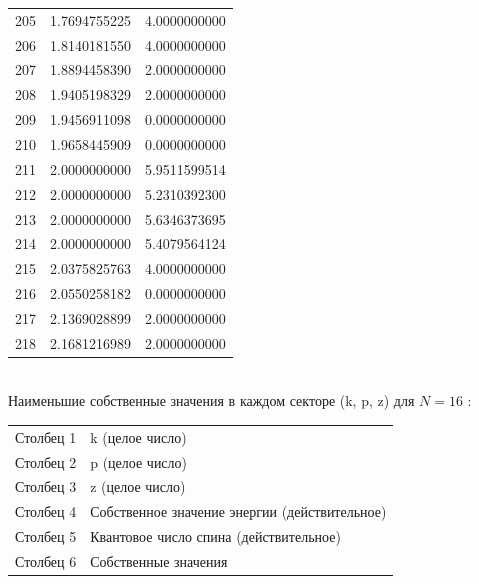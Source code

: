 \documentclass[11pt]{article}
\begin{document}
\begin{tabular}{lll}
  205      & 1.7694755225    & 4.0000000000 \\
  206      & 1.8140181550    & 4.0000000000 \\
  207      & 1.8894458390    & 2.0000000000 \\
  208      & 1.9405198329    & 2.0000000000 \\
  209      & 1.9456911098    & 0.0000000000 \\
  210      & 1.9658445909    & 0.0000000000 \\
  211      & 2.0000000000    & 5.9511599514 \\
  212      & 2.0000000000    & 5.2310392300 \\
  213      & 2.0000000000    & 5.6346373695 \\
  214      & 2.0000000000    & 5.4079564124 \\
  215      & 2.0375825763    & 4.0000000000 \\
  216      & 2.0550258182    & 0.0000000000 \\
  217      & 2.1369028899    & 2.0000000000 \\
  218      & 2.1681216989    & 2.0000000000 \\
\end{tabular}\\


Наименьшие собственные значения в каждом секторе (k, p, z) для $N = 16$ :\\
\begin{tabular}{ll}
Столбец 1 & k (целое число) \\
Столбец 2 & p (целое число) \\
Столбец 3 & z (целое число) \\
Столбец 4 & Собственное значение энергии (действительное) \\
Столбец 5 & Квантовое число спина (действительное) \\
Столбец 6 & Собственные значения \\
\end{tabular}\\
\end{document}
